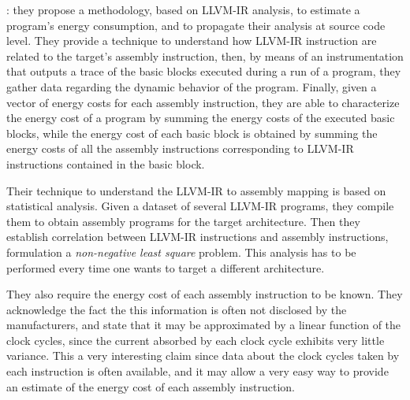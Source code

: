 \cite{brando2011}: they propose a methodology, based on LLVM-IR analysis, to estimate a program's energy consumption, and to propagate their analysis at source code level. They provide a technique to understand how LLVM-IR instruction are related to the target's assembly instruction, then, by means of an instrumentation that outputs a trace of the basic blocks executed during a run of a program, they gather data regarding the dynamic behavior of the program. Finally, given a vector of energy costs for each assembly instruction, they are able to characterize the energy cost of a program by summing the energy costs of the executed basic blocks, while the energy cost of each basic block is obtained by summing the energy costs of all the assembly instructions corresponding to LLVM-IR instructions contained in the basic block. \par 
Their technique to understand the LLVM-IR to assembly mapping is based on statistical analysis. Given a dataset of several LLVM-IR programs, they compile them to obtain assembly programs for the target architecture. Then they establish correlation between LLVM-IR instructions and assembly instructions, formulation a \emph{non-negative least square} problem. This analysis has to be performed every time one wants to target a different architecture. \par 
They also require the energy cost of each assembly instruction to be known. They acknowledge the fact the this information is often not disclosed by the manufacturers, and state that it may be approximated by a linear function of the clock cycles, since the  current absorbed by each clock cycle exhibits very little variance. This a very interesting claim since data about the clock cycles taken by each instruction is often available, and it may allow a very easy way to provide an estimate of the energy cost of each assembly instruction. \\[1in]



